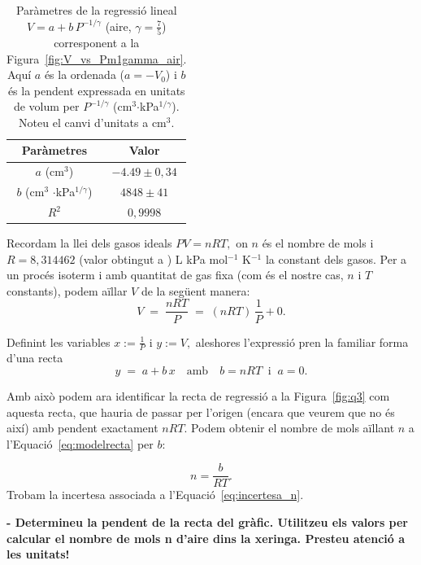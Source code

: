 \documentclass[a4paper,twoside,12pt]{article}
\theoremstyle{definition}
\begin{document}
	
\begin{table}[h]
	\centering
		\caption{Paràmetres de la regressió lineal $V = a + b\,P^{-1/\gamma}$ (aire, $\gamma=\tfrac{7}{5}$) corresponent a la Figura~\ref{fig:V_vs_Pm1gamma_air}. Aquí $a$ és la
		ordenada ($a=-V_0$) i $b$ és la pendent expressada en unitats de volum per $P^{-1/\gamma}$ (cm$^3$$\cdot$kPa$^{1/\gamma}$). Noteu el canvi d'unitats a cm$^3$.}
	\begin{tabular}{|c|c|}
		\hline
		Paràmetres & Valor \\
		\hline
		$a$ (cm$^3$) & $-4.49 \pm 0,34$ \\
		$b$ (cm$^3$ $\cdot$kPa$^{1/\gamma}$) & $4848 \pm 41$ \\
		$R^2$ & $0,9998$ \\
		\hline
	\end{tabular}
	\label{tab:reg1}

\end{table}

	
	Recordam la llei dels gasos ideals
	$
	PV = nRT,
	$
	 on $n$ és  el nombre de mols i $R = 8,314462 $ (valor obtingut a \cite{CODATA2018_R}) L kPa mol$^{-1}$ K$^{-1}$ la constant dels gasos. Per a un procés isoterm i amb quantitat de gas fixa (com és el nostre cas, $n$ i $T$ constants), podem aïllar $V$ de la següent manera:
	\begin{equation}
		\label{eq:reg1}
			V \;=\; \frac{nRT}{P} \;=\; (nRT)\,\frac{1}{P} + 0.
	\end{equation}

	Definint les variables
	$
	x := \frac{1}{P}$ i $
	y := V,
	$
	aleshores l’expressió pren la familiar forma d'una recta
	\begin{equation}
		\label{eq:modelrecta}
	y \;=\; a + b\,x \quad\text{amb}\quad b = nRT \;\;\text{i}\;\; a=0.
	\end{equation}

	
	Amb això podem ara identificar la recta de regressió a la Figura~\ref{fig:q3} com aquesta recta, que hauria de passar per l’origen (encara que veurem que no és així) amb pendent exactament $nRT$. Podem obtenir el nombre de mols aïllant $n$ a l'Equació~\ref{eq:modelrecta} per $b$:
	
	\begin{equation}
		\label{eq:n}
		n = \frac{b}{RT}.
	\end{equation}
	Trobam la incertesa associada a l'Equació~\ref{eq:incertesa_n}.
	
	
	\textbf{- Determineu la pendent de la recta del gràfic. Utilitzeu els valors per calcular el nombre de
		mols n d’aire dins la xeringa. Presteu atenció a les unitats!}
	
\end{document}
